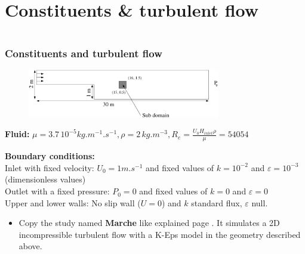 \documentclass[10pt, hyperref={unicode=true,pdfusetitle, bookmarks=true,bookmarksnumbered=false,bookmarksopen=false, breaklinks=false,pdfborder={0 0 1},backref=true,colorlinks=true,linkcolor=darkblue,pageanchor}]{beamer}
\begin{document}


\section{{\bf{Constituents \& turbulent flow}}}
\begin{frame}
\begin{columns}[c] 
\tableofcontents[sections={1-9},currentsection, currentsubsection]
\tableofcontents[sections={10-16},currentsection, currentsubsection]
\end{columns}
\end{frame}
\begin{frame}
\frametitle{Constituents and turbulent flow}
\begin{block}{}

\begin{figure}
\includegraphics[width=0.75\textwidth]{PICTURES/marche.pdf}
\end{figure}

\textbf{Fluid:} $\mu=3.7 \, 10^{-5} kg.m^{-1}.s^{-1}, \rho=2 \, kg.m^{-3}, R_e=\frac{U_0 H_{inlet} \rho}{\mu} =54054$

\textbf{Boundary conditions:} \\
Inlet with fixed velocity: $U_0=1 m.s^{-1}$ and fixed values of $k=10^{-2}$ and $\varepsilon=10^{-3}$ (dimensionless values)\\
Outlet with a fixed pressure: $P_0=0$ and fixed values of $k=0$ and $\varepsilon=0$ \\
Upper and lower walls: No slip wall ($U=0$) and $k$ standard flux, $\varepsilon$ null.

\begin{itemize}
\item Copy the study named \textbf{Marche} like explained page \pageref{method_copy}. It simulates a 2D incompressible turbulent flow with a K-Eps model in the geometry described above.
\end{itemize}

\end{block}
\end{frame}
\end{document}

